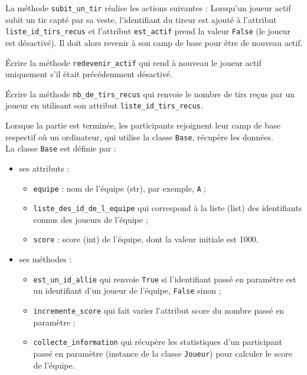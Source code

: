 \documentclass[a4paper,12pt,eval,firamath]{nsi}
\begin{document}
\question La méthode \texttt{subit_un_tir} réalise les actions suivantes :
Lorsqu'un joueur actif subit un tir capté par sa veste, l'identifiant du tireur est
ajouté à l'attribut \texttt{liste_id_tirs_recus} et l'attribut \texttt{est_actif} prend la
valeur \texttt{False} (le joueur est désactivé). Il doit alors revenir à son camp de base pour être de nouveau actif.
\begin{enumalph}
      \item Écrire la méthode \texttt{redevenir_actif} qui rend à nouveau le joueur actif uniquement s'il était précédemment désactivé.\\
      
      \item Écrire la méthode \texttt{nb_de_tirs_recus} qui renvoie le nombre de tirs reçus par un joueur en utilisant son attribut \texttt{liste_id_tirs_recus}.\\
      
\end{enumalph}

\question Lorsque la partie est terminée, les participants rejoignent leur camp de base respectif où un ordinateur, qui utilise la classe \texttt{Base}, récupère les données.\\
La classe \texttt{Base} est définie par :
\begin{itemize}
      \item ses attributs :
            \begin{itemize}
                  \item \texttt{equipe} : nom de l'équipe (str), par exemple, \texttt{A} ;
                  \item \texttt{liste_des_id_de_l_equipe} qui correspond à la liste (list) des identifiants connus des joueurs de l'équipe ;
                  \item \texttt{score} : score (int) de l'équipe, dont la valeur initiale est 1000.
            \end{itemize}
      \item ses méthodes :
            \begin{itemize}
                  \item \texttt{est_un_id_allie} qui renvoie \texttt{True} si l'identifiant passé en paramètre est un identifiant d'un joueur de l'équipe, \texttt{False} sinon ;
                  \item  \texttt{incremente_score} qui fait varier l'attribut score du nombre passé en paramètre ;
                  \item  \texttt{collecte_information} qui récupère les statistiques d'un participant passé en paramètre (instance de la classe \texttt{Joueur}) pour calculer le score de l'équipe.
            \end{itemize}
\end{itemize}
\end{document}

